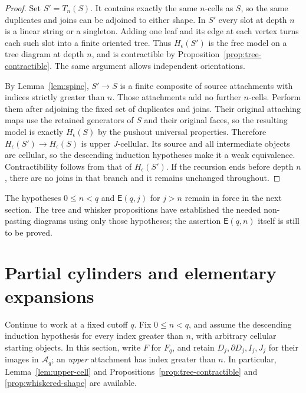 \documentclass[11pt,letterpaper]{article}
\numberwithin{equation}{section}
\theoremstyle{plain}
\theoremstyle{definition}
\theoremstyle{remark}
\begin{document}
\begin{proof}
Set $S'=T_n(S)$.  It contains exactly the same $n$-cells as $S$,
so the same duplicates and joins can be adjoined to either
shape.  In $S'$ every slot at depth $n$ is a linear string or a
singleton.  Adding one leaf and its edge at each vertex turns
each such slot into a finite oriented tree.  Thus
$H_\epsilon(S')$ is the free model on a tree diagram at depth
$n$, and is contractible by
Proposition~\ref{prop:tree-contractible}.  The same argument
allows independent orientations.

By Lemma~\ref{lem:spine}, $S'\to S$ is a finite composite of
source attachments with indices strictly greater than $n$.
Those attachments add no further $n$-cells.  Perform them after
adjoining the fixed set of duplicates and joins.  Their original
attaching maps use the retained generators of $S$ and their
original faces, so the resulting model is exactly
$H_\epsilon(S)$ by the pushout universal properties.  Therefore
$H_\epsilon(S')\to H_\epsilon(S)$ is upper $J$-cellular.  Its
source and all intermediate objects are cellular, so the
descending induction hypotheses make it a weak equivalence.
Contractibility follows from that of $H_\epsilon(S')$.
If the recursion ends before depth $n$, there are no joins in
that branch and it remains unchanged throughout.
\end{proof}

The hypotheses $0\leq n<q$ and $\mathsf E(q,j)$ for $j>n$
remain in force in the next section.  The tree and whisker
propositions have established the needed non-pasting diagrams
using only those hypotheses; the assertion $\mathsf E(q,n)$
itself is still to be proved.

\section{Partial cylinders and elementary expansions}
\label{sec:partial-cylinders}

Continue to work at a fixed cutoff \(q\).  Fix \(0\le n<q\), and
assume the descending induction hypothesis for every index greater than
\(n\), with arbitrary cellular starting objects.  In this section,
write \(F\) for \(F_q\), and retain \(D_j,\partial D_j,I_j,J_j\)
for their images in \(\mathcal A_q\); an \emph{upper} attachment has index greater than
\(n\).  In particular, Lemma~\ref{lem:upper-cell} and
Propositions~\ref{prop:tree-contractible} and
\ref{prop:whiskered-shape} are available.
\end{document}
